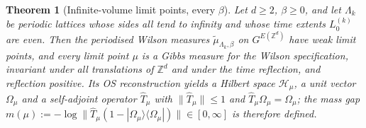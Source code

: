 \documentclass[11pt,a4paper]{article}
\newtheorem{theorem}{Theorem}[section]
\theoremstyle{definition}
\theoremstyle{remark}
\newcommand{\Z}{\mathbb{Z}}
\newcommand{\cH}{\mathcal{H}}
\newcommand{\hT}{\hat{T}}
\newcommand{\norm}[1]{\lVert #1\rVert}
\begin{document}
\begin{theorem}[Infinite-volume limit points, every $\beta$]\label{iv:thm:allbeta}
Let $d\ge2$, $\beta\ge0$, and let $\Lambda_k$ be periodic lattices whose sides all tend to infinity and whose time
extents $L_0^{(k)}$ are even. Then the periodised Wilson measures $\tilde\mu_{\Lambda_k,\beta}$ on $G^{E(\Z^d)}$ have weak
limit points, and every limit point $\mu$ is a Gibbs measure for the Wilson specification, invariant under all
translations of $\Z^d$ and under the time reflection, and reflection positive. Its OS reconstruction yields a Hilbert space
$\cH_\mu$, a unit vector $\Omega_\mu$ and a self-adjoint operator $\hT_\mu$ with $\norm{\hT_\mu}\le1$ and
$\hT_\mu\Omega_\mu=\Omega_\mu$; the \emph{mass gap}
$m(\mu):=-\log\norm{\hT_\mu(1-|\Omega_\mu\rangle\langle\Omega_\mu|)}\in[0,\infty]$ is therefore defined.
\end{theorem}
\end{document}
